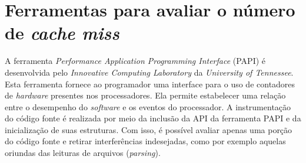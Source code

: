 \section{Ferramentas para avaliar o número de \textit{cache miss}}
\label{sec:ferramentasMiss}

   
A ferramenta \textit{Performance Application Programming Interface} (PAPI) \cite{papi} é desenvolvida pelo \textit{Innovative Computing Laboratory} da \textit{University of Tennessee}.
Esta ferramenta fornece ao programador uma interface para o uso de contadores de \textit{hardware} presentes nos processadores.
Ela permite estabelecer uma relação entre o desempenho do \textit{software} e os eventos do processador.
A instrumentação do código fonte é realizada por meio da inclusão da API da ferramenta PAPI e da inicialização de suas estruturas.
Com isso, é possível avaliar apenas uma porção do código fonte e retirar interferências indesejadas, como por exemplo aquelas oriundas das leituras de arquivos (\textit{parsing}).

\begin{table}[b]
\centering
\caption{Eventos presentes PAPI}
\label{tab:eventosPAPI}
\end{table}

